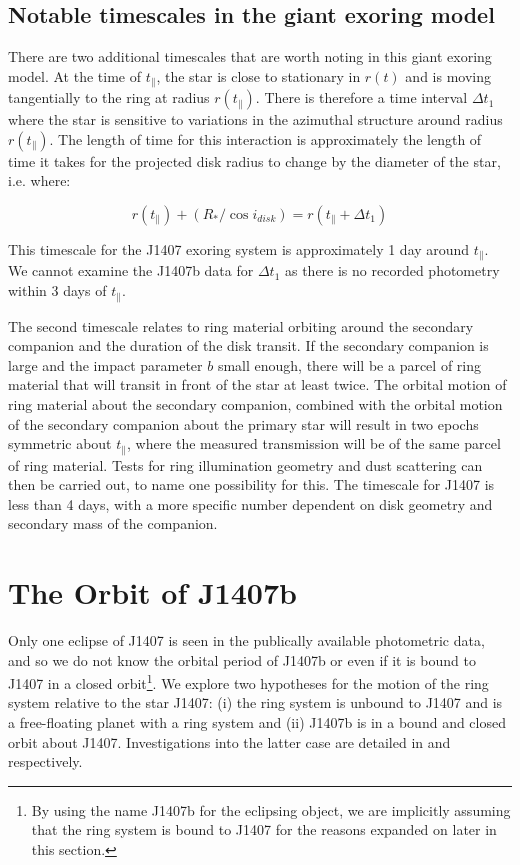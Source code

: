 \documentclass{emulateapj}
\newcommand{\tp}{t_\parallel}
\newcommand{\id}{i_{disk}}
\begin{document}
\subsection{Notable timescales in the giant exoring model}

There are two additional timescales that are worth noting in this giant
exoring model.
At the time of $\tp$, the star is close to stationary in $r(t)$ and is
moving tangentially to the ring at radius $r(\tp)$.
There is therefore a time interval $\Delta t_1$ where the star is
sensitive to variations in the azimuthal structure around radius
$r(\tp)$.
The length of time for this interaction is approximately the length of
time it takes for the projected disk radius to change by the diameter of
the star, i.e. where:

$$r(\tp) + (R_*/\cos \id) = r(\tp+\Delta t_1)$$

This timescale for the J1407 exoring system is approximately 1 day
around $\tp$.
We cannot examine the J1407b data for $\Delta t_1$ as there is no
recorded photometry within 3 days of $\tp$.

The second timescale relates to ring material orbiting around the
secondary companion and the duration of the disk transit.
If the secondary companion is large and the impact parameter
$b$ small enough, there will be a parcel of ring material that will
transit in front of the star at least twice.
The orbital motion of ring material about the secondary companion,
combined with the orbital motion of the secondary companion about the
primary star will result in two epochs symmetric about $\tp$, where the
measured transmission will be of the same parcel of ring material.
Tests for ring illumination geometry and dust scattering can then be
carried out, to name one possibility for this.
The timescale for J1407 is less than 4 days, with a more specific number
dependent on disk geometry and secondary mass of the companion.

\section{The Orbit of J1407b}
\label{sec:orbit}

Only one eclipse of J1407 is seen in the publically available
photometric data, and so we do
not know the orbital period of J1407b or even if it is bound to J1407
in a closed orbit\footnote{By using the name J1407b for the eclipsing object, we
are implicitly assuming that the ring system is bound to J1407 for the
reasons expanded on later in this section.}.
We explore two hypotheses for the motion of the ring system relative to the
star J1407: (i) the ring system is unbound to J1407 and is a
free-floating planet with a ring system and (ii) J1407b is in a bound
and closed orbit about J1407.
Investigations into the latter case are detailed in \citet{vanWerkhoven14}
and \citet{Kenworthy15} respectively.
\end{document}
